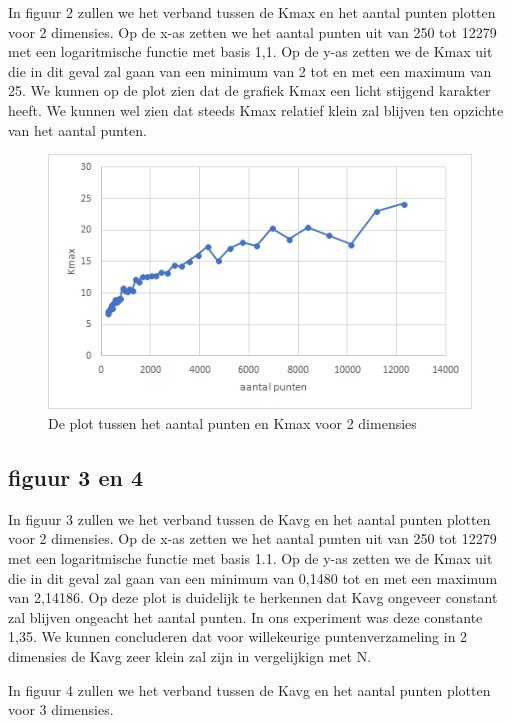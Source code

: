 \documentclass[12pt]{article}
\begin{document}
In figuur 2 zullen we het verband tussen de Kmax en het aantal punten plotten voor 2 dimensies.
Op de x-as zetten we het aantal punten uit van 250 tot 12279 met een logaritmische functie met basis 1,1.
Op de y-as zetten we de Kmax uit die in dit geval zal gaan van een minimum van 2 tot en met een maximum van 25.
We kunnen op de plot zien dat de grafiek Kmax een licht stijgend karakter heeft.
We kunnen wel zien dat steeds Kmax relatief klein zal blijven ten opzichte van het aantal punten.

\begin{figure}
\includegraphics[width=\textwidth]{punten-Kmax.png}
\caption{De plot tussen het aantal punten en Kmax voor 2 dimensies}
\end{figure}

\subsection{figuur 3 en 4}

In figuur 3 zullen we het verband tussen de Kavg en het aantal punten plotten voor 2 dimensies.
Op de x-as zetten we het aantal punten uit van 250 tot 12279 met een logaritmische functie met basis 1.1.
Op de y-as zetten we de Kmax uit die in dit geval zal gaan van een minimum van 0,1480 tot en met een maximum van 2,14186.
Op deze plot is duidelijk te herkennen dat Kavg ongeveer constant zal blijven ongeacht het aantal punten.
In ons experiment was deze constante 1,35.
We kunnen concluderen dat voor willekeurige puntenverzameling in 2 dimensies de Kavg zeer klein zal zijn in vergelijkign met N.



In figuur 4 zullen we het verband tussen de Kavg en het aantal punten plotten voor 3 dimensies.
\end{document}
